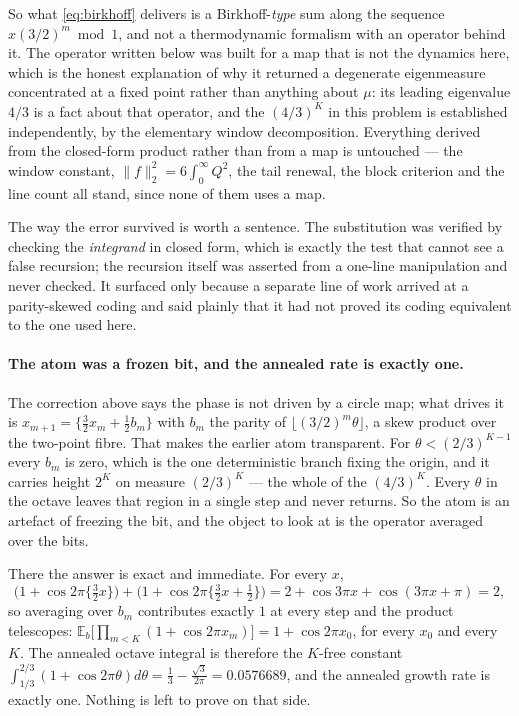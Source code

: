 \documentclass[11pt]{article}
\theoremstyle{remark}
\begin{document}
So what \eqref{eq:birkhoff} delivers is a Birkhoff-\emph{type} sum along the sequence
$x(3/2)^m\bmod1$, and not a thermodynamic formalism with an operator behind it. The operator written
below was built for a map that is not the dynamics here, which is the honest explanation of why it
returned a degenerate eigenmeasure concentrated at a fixed point rather than anything about $\mu$: its
leading eigenvalue $4/3$ is a fact about that operator, and the $(4/3)^K$ in this problem is established
independently, by the elementary window decomposition. Everything derived from the closed-form product
rather than from a map is untouched --- the window constant, $\|f\|_2^2=6\int_0^\infty Q^2$, the tail
renewal, the block criterion and the line count all stand, since none of them uses a map.

The way the error survived is worth a sentence. The substitution was verified by checking the
\emph{integrand} in closed form, which is exactly the test that cannot see a false recursion; the
recursion itself was asserted from a one-line manipulation and never checked. It surfaced only because a
separate line of work arrived at a parity-skewed coding and said plainly that it had not proved its
coding equivalent to the one used here.

\paragraph{The atom was a frozen bit, and the annealed rate is exactly one.} The correction above says the
phase is not driven by a circle map; what drives it is $x_{m+1}=\{\tfrac32x_m+\tfrac12b_m\}$ with
$b_m$ the parity of $\lfloor(3/2)^m\theta\rfloor$, a skew product over the two-point fibre. That makes the
earlier atom transparent. For $\theta<(2/3)^{K-1}$ every $b_m$ is zero, which is the one deterministic
branch fixing the origin, and it carries height $2^K$ on measure $(2/3)^K$ --- the whole of the $(4/3)^K$.
Every $\theta$ in the octave leaves that region in a single step and never returns. So the atom is an
artefact of freezing the bit, and the object to look at is the operator averaged over the bits.

There the answer is exact and immediate. For every $x$,
\[
  \bigl(1+\cos2\pi\{\tfrac32x\}\bigr)+\bigl(1+\cos2\pi\{\tfrac32x+\tfrac12\}\bigr)
  =2+\cos3\pi x+\cos(3\pi x+\pi)=2 ,
\]
so averaging over $b_m$ contributes exactly $1$ at every step and the product telescopes:
$\mathbb E_b\bigl[\prod_{m<K}(1+\cos2\pi x_m)\bigr]=1+\cos2\pi x_0$, for every $x_0$ and every $K$. The
annealed octave integral is therefore the $K$-free constant
$\int_{1/3}^{2/3}(1+\cos2\pi\theta)d\theta=\tfrac13-\tfrac{\sqrt3}{2\pi}=0.0576689$, and the annealed
growth rate is exactly one. Nothing is left to prove on that side.
\end{document}
